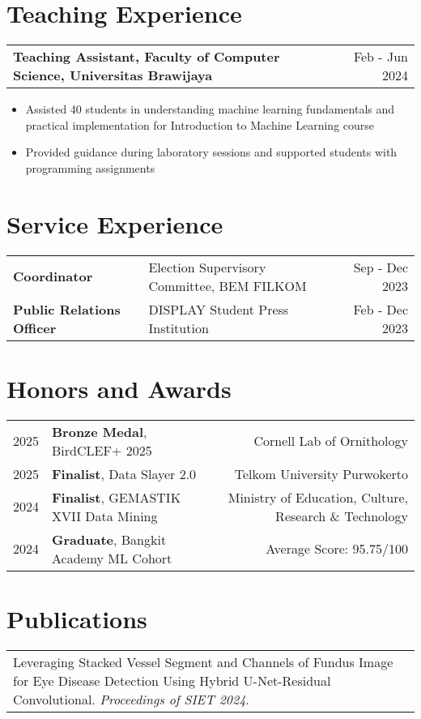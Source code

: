 \documentclass[a4paper,10pt]{article}
\makeatletter
\newenvironment{joblong}[2]
    {
    \begin{tabularx}{\linewidth}{@{}l X r@{}}
    \textbf{#1} & \hfill & #2 \\[2pt]
    \end{tabularx}
    \begin{minipage}[t]{\linewidth}
    \begin{itemize}[nosep,after=\strut, leftmargin=1em, itemsep=1pt, label=\textbullet]
    }
    {
    \end{itemize}
    \end{minipage}    
    }
\makeatother
\begin{document}
\section{Teaching Experience}

\begin{joblong}{Teaching Assistant, Faculty of Computer Science, Universitas Brawijaya}{Feb - Jun 2024}
\item Assisted 40 students in understanding machine learning fundamentals and practical implementation for Introduction to Machine Learning course
\item Provided guidance during laboratory sessions and supported students with programming assignments
\end{joblong}

\section{Service Experience}
\begin{tabularx}{\linewidth}{@{}l X r@{}}
\textbf{Coordinator} & Election Supervisory Committee, BEM FILKOM & Sep - Dec 2023 \\
\textbf{Public Relations Officer} & DISPLAY Student Press Institution & Feb - Dec 2023 \\
\end{tabularx}

\section{Honors and Awards}
\begin{tabularx}{\linewidth}{@{}l X r@{}}
2025 & \textbf{Bronze Medal}, BirdCLEF+ 2025 & Cornell Lab of Ornithology \\
2025 & \textbf{Finalist}, Data Slayer 2.0 & Telkom University Purwokerto \\
2024 & \textbf{Finalist}, GEMASTIK XVII Data Mining & Ministry of Education, Culture, Research \& Technology \\
2024 & \textbf{Graduate}, Bangkit Academy ML Cohort & Average Score: 95.75/100 \\
\end{tabularx}

\section{Publications}
\begin{tabularx}{\linewidth}{@{}X@{}}
Leveraging Stacked Vessel Segment and Channels of Fundus Image for Eye Disease Detection Using Hybrid U-Net-Residual Convolutional. \textit{Proceedings of SIET 2024}. \\
\end{tabularx}
\end{document}
